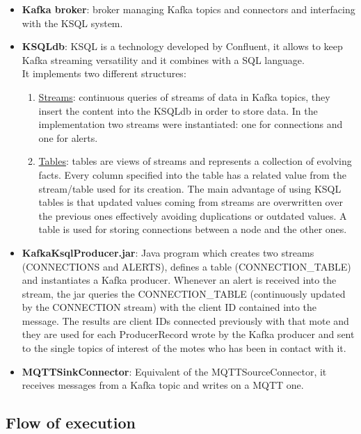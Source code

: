 \documentclass[table, 12pt]{article}
\begin{document}
\begin{itemize}
    \item \textbf{Kafka broker}: broker managing Kafka topics and connectors and interfacing with the KSQL system.
    \item \textbf{KSQLdb}: KSQL is a technology developed by Confluent, it allows to keep Kafka streaming versatility and it combines with a SQL language. \\It implements two different structures:
          \begin{enumerate}
              \item \underline{Streams}: continuous queries of streams of data in Kafka topics, they insert the content into the KSQLdb in order to store data. In the implementation two streams were instantiated: one for connections and one for alerts.
              \item \underline{Tables}: tables are views of streams and represents a collection of evolving facts. Every column specified into the table has a related value from the stream/table used for its creation. The main advantage of using KSQL tables is that updated values coming from streams are overwritten over the previous ones effectively avoiding duplications or outdated values. A table is used for storing connections between a node and the other ones.
          \end{enumerate}
    \item \textbf{KafkaKsqlProducer.jar}: Java program which creates two streams (CONNECTIONS and ALERTS), defines a table (CONNECTION\_TABLE) and instantiates a Kafka producer. Whenever an alert is received into the stream, the jar queries the CONNECTION\_TABLE (continuously updated by the CONNECTION stream) with the client ID contained into the message. The results are client IDs connected previously with that mote and they are used for each ProducerRecord wrote by the Kafka producer and sent to the single topics of interest of the motes who has been in contact with it.
    \item \textbf{MQTTSinkConnector}: Equivalent of the MQTTSourceConnector, it receives messages from a Kafka topic and writes on a MQTT one.

\end{itemize}


\subsection{Flow of execution}
\end{document}
